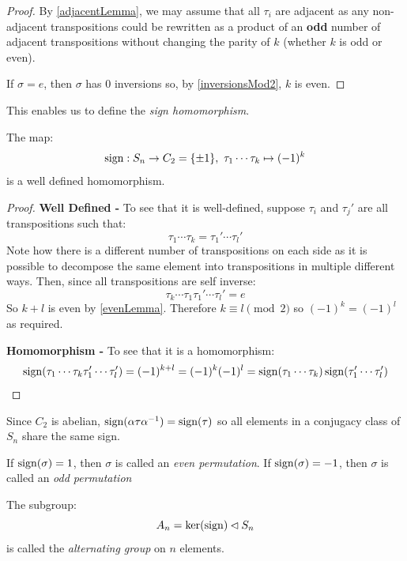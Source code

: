 \documentclass[../main.tex]{subfiles}
\begin{document}
\begin{proof}
  By \cref{adjacentLemma}, we may assume that all $\tau_i$ are adjacent as any non-adjacent transpositions could be rewritten as a product of an \textbf{odd} number of adjacent transpositions without changing the parity of $k$ (whether $k$ is odd or even).

  If $\sigma = e$, then $\sigma$ has 0 inversions so, by \cref{inversionsMod2}, $k$ is even.
\end{proof}
This enables us to define the \textit{sign homomorphism}.
\begin{theorem}
  The map:
  \[
    \operatorname{sign}: S_n \to C_2 = \{\pm 1\},\ \tau_1 \cdots \tau_k \mapsto (-1)^{k}
  \]
  is a well defined homomorphism.
\end{theorem}
\begin{proof}\par
  \textbf{Well Defined -} To see that it is well-defined, suppose $\tau_i$ and $\tau_j'$ are all transpositions such that:
  \[
    \tau_1 \cdots \tau_k = \tau_1' \cdots \tau_l'
  \]
  Note how there is a different number of transpositions on each side as it is possible to decompose the same element into transpositions in multiple different ways.
  Then, since all transpositions are self inverse:
  \[
    \tau_k \cdots \tau_1 \tau_1' \cdots \tau_l' = e
  \]
  So $k + l$ is even by \cref{evenLemma}.
  Therefore $k \equiv l \pmod{2}$ so $(-1)^{k} = (-1)^{l}$ as required.

  \textbf{Homomorphism -} To see that it is a homomorphism:
  \[
    \operatorname{sign}(\tau_1 \cdots \tau_k \tau_1' \cdots \tau_l') = (-1)^{k + l} = (-1)^{k}(-1)^{l} = \operatorname{sign}(\tau_1 \cdots \tau_k)\operatorname{sign}(\tau_1' \cdots \tau_l')
  \]
\end{proof}
\begin{remark}
  Since $C_2$ is abelian, $\operatorname{sign}(\alpha \tau \alpha^{-1}) = \operatorname{sign}(\tau)$ so all elements in a conjugacy class of $S_n$ share the same sign.
\end{remark}
\begin{definition}
  If $\operatorname{sign}(\sigma) = 1$, then $\sigma$ is called an \textit{even permutation}.
  If $\operatorname{sign}(\sigma) = -1$, then $\sigma$ is called an \textit{odd permutation}
\end{definition}
\begin{definition}
  The subgroup:
  \[
    A_n = \ker(\operatorname{sign}) \lhd S_n
  \]
  is called the \textit{alternating group} on $n$ elements.
\end{definition}
\end{document}
